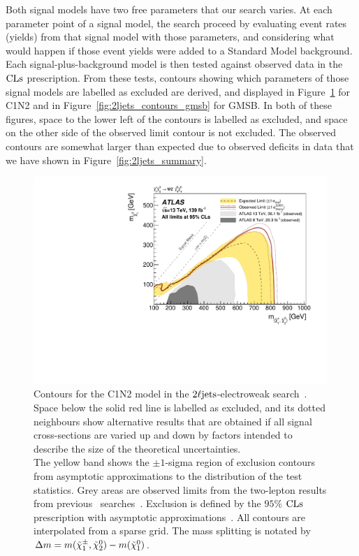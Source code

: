 Both signal models have two free parameters that our search varies.
At each parameter point of a signal model, the search proceed by evaluating
event rates (yields) from that signal model with those parameters,
and considering what would happen if those event yields were added to a
Standard Model background.
Each signal-plus-background model is then tested against observed data in the
$\mathrm{CLs}$ prescription.
From these tests, contours showing which parameters of those signal models are
labelled as excluded are derived, and displayed in
Figure~\ref{fig:2ljets_contours_c1n2} for C1N2 and in
Figure~\ref{fig:2ljets_contours_gmsb} for GMSB.
In both of these figures, space to the lower left of the contours is
labelled as excluded, and space on the other side of the observed limit contour
is not excluded.
The observed contours are somewhat larger than expected due to observed
deficits in data that we have shown in Figure~\ref{fig:2ljets_summary}.

\begin{figure}[tp]
\centering
\includegraphics[width=0.99\textwidth]{figures/2ljets_contours_c1n2.pdf}
\caption[
Contours for the C1N2 model in the $\twoljets$-electroweak search
]{%
Contours for the C1N2 model in the $\twoljets$-electroweak
search~\cite{atlas2022searches}.
\\[0.5em]
Space below the solid red line is labelled as excluded, and its dotted
neighbours show alternative results that are obtained if all signal
cross-sections are varied up and down by factors intended to describe the size
of the theoretical uncertainties.
\\[0.5em]
The yellow band shows the $\pm1$-sigma region of exclusion contours
from asymptotic approximations to the distribution of the test statistics.
Grey areas are observed limits from the two-lepton results from previous
\atlas\ searches~\cite{atlas_23l_SUSY_2016_24, atlas_2l_SUSY_2013_11}.
Exclusion is defined by the $95\%$ $\mathrm{CLs}$ prescription
with asymptotic approximations~\cite{Cowan:2010js}.
All contours are interpolated from a sparse grid.
The mass splitting is notated by
$\Delta m = m(\tilde\chi^\pm_1, \tilde\chi^0_2) - m(\tilde\chi^0_1)$.
}
\label{fig:2ljets_contours_c1n2}
\end{figure}

